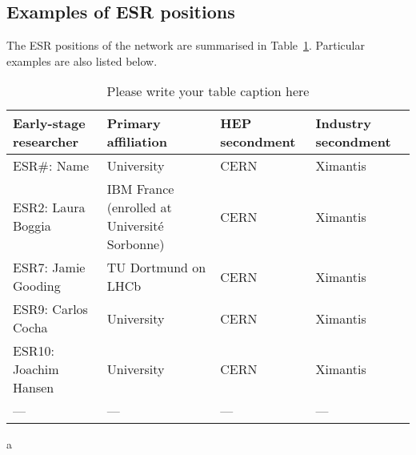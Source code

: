 \subsection{Examples of ESR positions}
\label{esr-examples}
The ESR positions of the network are summarised in Table~\ref{esr-positions}. Particular examples are also listed below.
\begin{table}[h!]
    \centering
    \caption{Please write your table caption here}
    \label{esr-positions}       
    \begin{tabular}{llll}
    \hline
    Early-stage researcher & Primary affiliation & HEP secondment & Industry secondment \\\hline
    ESR\#: Name & University & CERN & Ximantis \\
    ESR2: Laura Boggia & IBM France (enrolled at Universit\'e Sorbonne) & CERN & Ximantis \\
    ESR7: Jamie Gooding & TU Dortmund on LHCb & CERN & Ximantis \\
    ESR9: Carlos Cocha & University & CERN & Ximantis \\
    ESR10: Joachim Hansen & University & CERN & Ximantis \\
    --- & --- & --- & --- \\\hline
    \end{tabular}
\end{table}
a